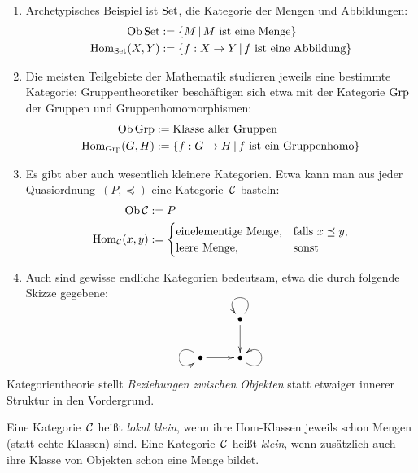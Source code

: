 \begin{bsp}\begin{enumerate}
  \item Archetypisches Beispiel ist $\mathrm{Set}$, die Kategorie der Mengen und Abbildungen:
  \begin{align*}
    \operatorname{Ob} \mathrm{Set} &:= \{ M \,|\, \text{$M$ ist eine Menge} \} \\
    \mathrm{Hom}_{\mathrm{Set}}(X,Y) &:= \{ f:X \to Y \,|\, \text{$f$ ist eine Abbildung} \}
  \end{align*}
  \item Die meisten Teilgebiete der Mathematik studieren jeweils eine bestimmte
  Kategorie: Gruppentheoretiker beschäftigen sich etwa mit der Kategorie
  $\mathrm{Grp}$ der Gruppen und Gruppenhomomorphismen:
  \begin{align*}
    \operatorname{Ob} \mathrm{Grp} &:= \text{Klasse aller Gruppen} \\
    \mathrm{Hom}_{\mathrm{Grp}}(G,H) &:= \{ f:G \to H \,|\, \text{$f$ ist ein Gruppenhomo} \}
  \end{align*}
  \item Es gibt aber auch wesentlich kleinere Kategorien. Etwa kann man aus
  jeder Quasiordnung~$(P,\preceq)$ eine Kategorie~$\mathcal{C}$ basteln:
  \begin{align*}
    \operatorname{Ob} \mathcal{C} &:= P \\
    \mathrm{Hom}_{\mathcal{C}}(x,y) &:= \begin{cases}
      \text{einelementige Menge}, & \text{falls $x \preceq y$,} \\
      \text{leere Menge}, & \text{sonst}
    \end{cases}
  \end{align*}
  \item Auch sind gewisse endliche Kategorien bedeutsam, etwa die durch
  folgende Skizze gegebene:

  \[ \xymatrix{
    & \bullet \ar[d] \ar@(ur,ul) \\
    \bullet \ar[r] \ar@(ul,dl) & \bullet \ar@(dr,ur)
  } \]
\end{enumerate}\end{bsp}

\begin{motto}[fundamental]Kategorientheorie stellt \emph{Beziehungen zwischen
Objekten} statt etwaiger innerer Struktur in den Vordergrund.\end{motto}

\begin{defn}Eine Kategorie~$\mathcal{C}$ heißt \emph{lokal klein}, wenn ihre Hom-Klassen
jeweils schon Mengen (statt echte Klassen) sind. Eine Kategorie~$\mathcal{C}$ heißt
\emph{klein}, wenn zusätzlich auch ihre Klasse von Objekten schon eine Menge
bildet.\end{defn}


